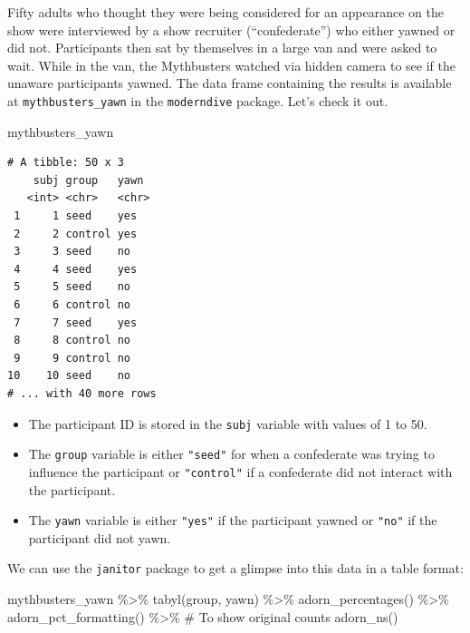\documentclass[
  letterpaper,
  DIV=11,
  numbers=noendperiod]{scrreprt}
\newenvironment{Shaded}{\begin{snugshade}}{\end{snugshade}}
\newcommand{\CommentTok}[1]{\textcolor[rgb]{0.37,0.37,0.37}{#1}}
\newcommand{\FunctionTok}[1]{\textcolor[rgb]{0.28,0.35,0.67}{#1}}
\newcommand{\NormalTok}[1]{\textcolor[rgb]{0.00,0.23,0.31}{#1}}
\newcommand{\SpecialCharTok}[1]{\textcolor[rgb]{0.37,0.37,0.37}{#1}}
\providecommand{\tightlist}{%
  \setlength{\itemsep}{0pt}\setlength{\parskip}{0pt}}\usepackage{longtable,booktabs,array}
\theoremstyle{definition}
\theoremstyle{remark}
\begin{document}
Fifty adults who thought they were being considered for an appearance on
the show were interviewed by a show recruiter (``confederate'') who
either yawned or did not. Participants then sat by themselves in a large
van and were asked to wait. While in the van, the Mythbusters watched
via hidden camera to see if the unaware participants yawned. The data
frame containing the results is available at \texttt{mythbusters\_yawn}
in the \texttt{moderndive} package. Let's check it out.

\begin{Shaded}
\begin{Highlighting}[]
\NormalTok{mythbusters\_yawn}
\end{Highlighting}
\end{Shaded}

\begin{verbatim}
# A tibble: 50 x 3
    subj group   yawn 
   <int> <chr>   <chr>
 1     1 seed    yes  
 2     2 control yes  
 3     3 seed    no   
 4     4 seed    yes  
 5     5 seed    no   
 6     6 control no   
 7     7 seed    yes  
 8     8 control no   
 9     9 control no   
10    10 seed    no   
# ... with 40 more rows
\end{verbatim}

\begin{itemize}
\tightlist
\item
  The participant ID is stored in the \texttt{subj} variable with values
  of 1 to 50.
\item
  The \texttt{group} variable is either \texttt{"seed"} for when a
  confederate was trying to influence the participant or
  \texttt{"control"} if a confederate did not interact with the
  participant.
\item
  The \texttt{yawn} variable is either \texttt{"yes"} if the participant
  yawned or \texttt{"no"} if the participant did not yawn.
\end{itemize}

We can use the \texttt{janitor} package to get a glimpse into this data
in a table format:

\begin{Shaded}
\begin{Highlighting}[]
\NormalTok{mythbusters\_yawn }\SpecialCharTok{\%\textgreater{}\%} 
  \FunctionTok{tabyl}\NormalTok{(group, yawn) }\SpecialCharTok{\%\textgreater{}\%} 
  \FunctionTok{adorn\_percentages}\NormalTok{() }\SpecialCharTok{\%\textgreater{}\%} 
  \FunctionTok{adorn\_pct\_formatting}\NormalTok{() }\SpecialCharTok{\%\textgreater{}\%} 
  \CommentTok{\# To show original counts}
  \FunctionTok{adorn\_ns}\NormalTok{()}
\end{Highlighting}
\end{Shaded}
\end{document}
